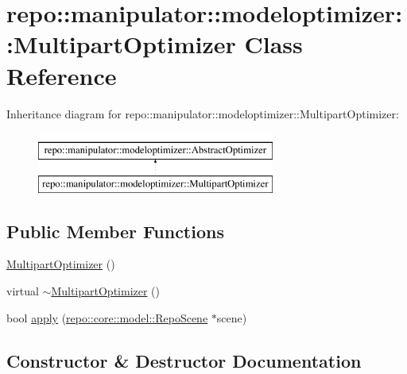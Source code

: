 \hypertarget{classrepo_1_1manipulator_1_1modeloptimizer_1_1_multipart_optimizer}{}\section{repo\+:\+:manipulator\+:\+:modeloptimizer\+:\+:Multipart\+Optimizer Class Reference}
\label{classrepo_1_1manipulator_1_1modeloptimizer_1_1_multipart_optimizer}
Inheritance diagram for repo\+:\+:manipulator\+:\+:modeloptimizer\+:\+:Multipart\+Optimizer\+:\begin{figure}[H]
\begin{center}
\leavevmode
\includegraphics[height=2.000000cm]{classrepo_1_1manipulator_1_1modeloptimizer_1_1_multipart_optimizer}
\end{center}
\end{figure}
\subsection*{Public Member Functions}
\begin{DoxyCompactItemize}
\item 
\hyperlink{classrepo_1_1manipulator_1_1modeloptimizer_1_1_multipart_optimizer_a2f4e43f341ec4badbc60ce51499ed0ab}{Multipart\+Optimizer} ()
\item 
virtual \hyperlink{classrepo_1_1manipulator_1_1modeloptimizer_1_1_multipart_optimizer_a9e7354058021e00d6d75e63eef3b57cd}{$\sim$\+Multipart\+Optimizer} ()
\item 
bool \hyperlink{classrepo_1_1manipulator_1_1modeloptimizer_1_1_multipart_optimizer_a3e223c461f5b27c09f9037a57ff3fd01}{apply} (\hyperlink{classrepo_1_1core_1_1model_1_1_repo_scene}{repo\+::core\+::model\+::\+Repo\+Scene} $\ast$scene)
\end{DoxyCompactItemize}


\subsection{Constructor \& Destructor Documentation}
\hypertarget{classrepo_1_1manipulator_1_1modeloptimizer_1_1_multipart_optimizer_a2f4e43f341ec4badbc60ce51499ed0ab}{}
